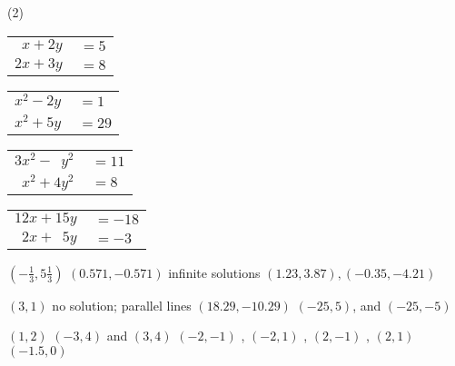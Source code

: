 \begin{Exercise}[title={Systems of Equations},label=ex14]
		\begin{tasks}(2)
			\task 	 
			\begin{tabular}{r@{}l}%
				$x+2y\,$&$=5$\\
				$2x+3y\,$&$=8$
			\end{tabular}\medskip	
			\task   
			\begin{tabular}{r@{}l}%
				$x^2-2y\,$&$=1$\\
				$x^2+5y\,$&$=29$
			\end{tabular} 
			\task
			\begin{tabular}{r@{}l}%
				$3x^2-\phantom{1}y^2\,$&$=11$\\
				$\phantom{1}x^2+4y^2\,$&$=8$
			\end{tabular} 	 
			\task    
			\begin{tabular}{r@{}l}%
				$12x+15y\,$&$=-18$\\
				$2x+\phantom{1}5y\,$&$=-3$
			\end{tabular} 	 
		\end{tasks}
\end{Exercise}%

\begin{Answer}[ref={ex14}]	
\Question %
\begin{tasks}
	\task 	$(-\frac{1}{3},5\frac{1}{3})$
	\task   $(0.571,-0.571)$ 
	\task 	infinite solutions 
	\task   $\left (1.23 ,3.87\right ) ,\left ( -0.35 , -4.21\right )$ 
\end{tasks}
\Question %
\begin{tasks}
	\task 	 $(3,1)$
	\task    no solution; parallel lines
	\task 	 $(18.29,-10.29)$
	\task    $(-25,5)$, and $(-25,-5)$
\end{tasks}
\Question %
\begin{tasks}
	\task 	 $(1,2)$
	\task    $(-3,4)$ and $(3,4)$
	\task 	 $(-2,-1)$ , $(-2,1)$ , $(2,-1)$ , $(2,1)$
	\task    $(-1.5,0)$
\end{tasks}
\end{Answer}%

